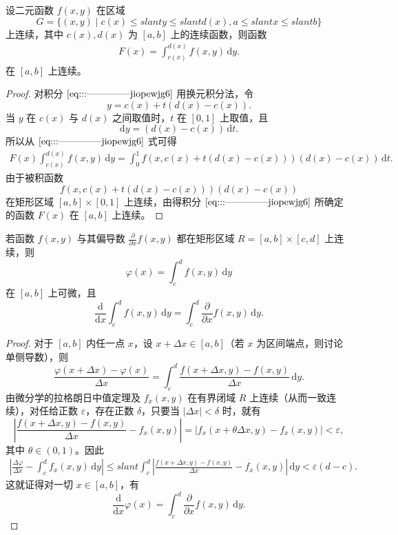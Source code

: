 \documentclass[../../main.tex]{subfiles}
\begin{document}
\begin{theorem}[连续性]\label{theorem:含参量积分的连续性1}
设二元函数 \( f(x,y) \) 在区域
\[
G = \{ (x,y) \mid c(x) \leqslant slant y \leqslant slant d(x), a \leqslant slant x \leqslant slant b \}
\]
上连续，其中 \( c(x), d(x) \) 为 \( [a,b] \) 上的连续函数，则函数
\begin{align}
F(x) = \int_{c(x)}^{d(x)} f(x,y) \, \mathrm{d}y. \label{eq:::--------------jiopewjg6}
\end{align}
在 \( [a,b] \) 上连续。
\end{theorem}
\begin{proof}
对积分 \(\eqref{eq:::--------------jiopewjg6}\) 用换元积分法，令
\[
y = c(x) + t(d(x) - c(x)).
\]
当 \( y \) 在 \( c(x) \) 与 \( d(x) \) 之间取值时，\( t \) 在 \( [0,1] \) 上取值，且
\[
\mathrm{d}y = (d(x) - c(x)) \, \mathrm{d}t.
\]
所以从 \(\eqref{eq:::--------------jiopewjg6}\) 式可得
\begin{align*}
F(x)  \int_{c(x)}^{d(x)} f(x,y) \, \mathrm{d}y
= \int_{0}^{1} f(x,c(x) + t(d(x) - c(x))) (d(x) - c(x)) \, \mathrm{d}t.
\end{align*}
由于被积函数
\[
f(x,c(x) + t(d(x) - c(x))) (d(x) - c(x))
\]
在矩形区域 \( [a,b] \times [0,1] \) 上连续，由得积分 \(\eqref{eq:::--------------jiopewjg6}\) 所确定的函数 \( F(x) \) 在 \( [a,b] \) 上连续。
\end{proof}

\begin{theorem}[可微性]\label{theorem:含参量积分的可微性1}
若函数 \( f(x,y) \) 与其偏导数 \( \frac{\partial}{\partial x}f(x,y) \) 都在矩形区域 \( R = [a,b] \times [c,d] \) 上连续，则
\[
\varphi(x) = \int_{c}^{d} f(x,y) \, \mathrm{d}y
\]
在 \( [a,b] \) 上可微，且
\[
\frac{\mathrm{d}}{\mathrm{d}x} \int_{c}^{d} f(x,y) \, \mathrm{d}y = \int_{c}^{d} \frac{\partial}{\partial x} f(x,y) \, \mathrm{d}y.
\]
\end{theorem}
\begin{proof}
对于 \( [a,b] \) 内任一点 \( x \)，设 \( x + \Delta x \in [a,b] \)（若 \( x \) 为区间端点，则讨论单侧导数），则
\[
\frac{\varphi(x + \Delta x) - \varphi(x)}{\Delta x} = \int_{c}^{d} \frac{f(x + \Delta x,y) - f(x,y)}{\Delta x} \, \mathrm{d}y.
\]
由微分学的拉格朗日中值定理及 \( f_x(x,y) \) 在有界闭域 \( R \) 上连续（从而一致连续），对任给正数 \( \varepsilon \)，存在正数 \( \delta \)，只要当 \( |\Delta x| < \delta \) 时，就有
\[
\left| \frac{f(x + \Delta x,y) - f(x,y)}{\Delta x} - f_x(x,y) \right|
= |f_x(x + \theta \Delta x,y) - f_x(x,y)| < \varepsilon,
\]
其中 \( \theta \in (0,1) \)。因此
\begin{align*}
\left| \frac{\Delta \varphi}{\Delta x} - \int_{c}^{d} f_x(x,y) \, \mathrm{d}y \right|
\leqslant slant \int_{c}^{d} \left| \frac{f(x + \Delta x,y) - f(x,y)}{\Delta x} - f_x(x,y) \right| \, \mathrm{d}y
< \varepsilon(d - c).
\end{align*}
这就证得对一切 \( x \in [a,b] \)，有
\[
\frac{\mathrm{d}}{\mathrm{d}x} \varphi(x) = \int_{c}^{d} \frac{\partial}{\partial x} f(x,y) \, \mathrm{d}y.
\]
\end{proof}
\end{document}

